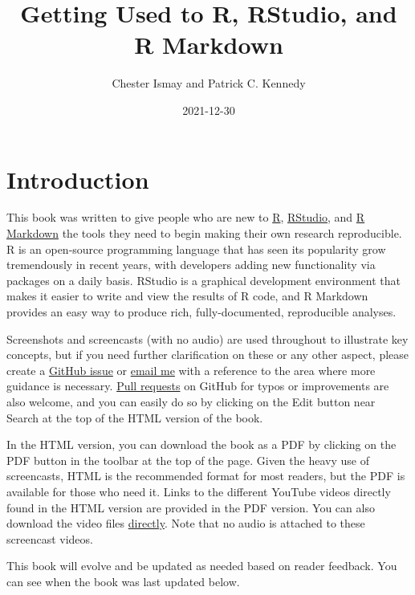 \documentclass[]{tufte-book}
\title{Getting Used to R, RStudio, and R Markdown}
\author{Chester Ismay and Patrick C. Kennedy}
\date{2021-12-30}
\begin{document}
\maketitle



{
\setcounter{tocdepth}{1}
\tableofcontents
}

\hypertarget{intro}{%
\chapter{Introduction}\label{intro}}

This book was written to give people who are new to \href{https://www.r-project.org}{R}, \href{https://www.rstudio.com}{RStudio}, and \href{http://rmarkdown.rstudio.com}{R Markdown} the tools they need to begin making their own research reproducible. R is an open-source programming language that has seen its popularity grow tremendously in recent years, with developers adding new functionality via packages on a daily basis. RStudio is a graphical development environment that makes it easier to write and view the results of R code, and R Markdown provides an easy way to produce rich, fully-documented, reproducible analyses.

Screenshots and screencasts (with no audio) are used throughout to illustrate key concepts, but if you need further clarification on these or any other aspect, please create a \href{https://github.com/ismayc/rbasics-book/issues}{GitHub issue} or \href{mailto:chester.ismay@gmail.com}{email me} with a reference to the area where more guidance is necessary. \href{https://code.tutsplus.com/courses/git-basics-github-pull-requests}{Pull requests} on GitHub for typos or improvements are also welcome, and you can easily do so by clicking on the Edit button near Search at the top of the HTML version of the book.

In the HTML version, you can download the book as a PDF by clicking on the PDF button in the toolbar at the top of the page. Given the heavy use of screencasts, HTML is the recommended format for most readers, but the PDF is available for those who need it. Links to the different YouTube videos directly found in the HTML version are provided in the PDF version. You can also download the video files \href{https://github.com/ismayc/rbasics-book/tree/master/mp4}{directly}. Note that no audio is attached to these screencast videos.

This book will evolve and be updated as needed based on reader feedback. You can see when the book was last updated below.
\end{document}

